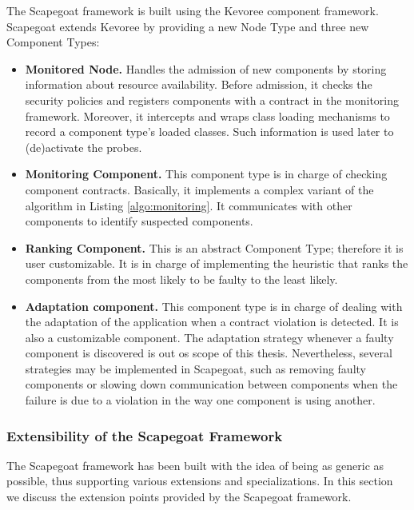 The Scapegoat framework is built using the Kevoree component framework.
Scapegoat extends Kevoree by providing a new Node Type and three new Component Types:
\begin{itemize}
\leftskip -.2in
\item \textbf{Monitored Node.}
Handles the admission of new components by storing information about resource availability.
Before admission, it checks the security policies and registers components with a contract in the monitoring framework.
Moreover, it intercepts and wraps class loading mechanisms to record a component type's loaded classes.
Such information is used later to (de)activate the probes.
\item \textbf{Monitoring Component.}
This component type is in charge of checking component contracts. 
Basically, it implements a complex variant of the algorithm in Listing \ref{algo:monitoring}.
It communicates with other components to identify suspected components.
\item \textbf{Ranking Component.}
This is an abstract Component Type; therefore it is user customizable.
It is in charge of implementing the heuristic that ranks the components from the most likely to be faulty to the least likely.
\item \textbf{Adaptation component.}
This component type is in charge of dealing with the adaptation of the application when a contract violation is detected.
It is also a customizable component.
The adaptation strategy whenever a faulty component is discovered is out os scope of this thesis.
Nevertheless, several strategies may be implemented in Scapegoat, such as removing faulty components or slowing down communication between components when the failure is due to a violation in the way one component is using another.
\end{itemize}

\subsubsection{Extensibility of the Scapegoat Framework}

The Scapegoat framework has been built with the idea of being as generic as possible, thus supporting various extensions and specializations.
In this section we discuss the extension points provided by the Scapegoat framework.

